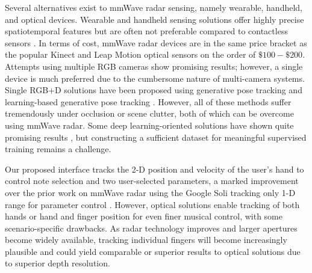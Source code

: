 \documentclass[10pt,journal,final]{IEEEtran}
\begin{document}
Several alternatives exist to mmWave radar sensing, namely wearable, handheld, and optical devices. 
Wearable and handheld sensing solutions offer highly precise spatiotemporal features but are often not preferable compared to contactless sensors \cite{pardue2013hand,neto2010high}.
In terms of cost, mmWave radar devices are in the same price bracket as the popular Kinect and Leap Motion optical sensors on the order of $\$100-\$200$.
Attempts using multiple RGB cameras \cite{ballan2012motion,sridhar2013interactive} show promising results; however, a single device is much preferred due to the cumbersome nature of multi-camera systems. 
Single RGB+D solutions have been proposed using generative pose tracking \cite{oikonomidis2011efficient,tang2015opening} and learning-based generative pose tracking \cite{sridhar2015fast,taylor2016efficient}.
However, all of these methods suffer tremendously under occlusion or scene clutter, both of which can be overcome using mmWave radar. 
Some deep learning-oriented solutions have shown quite promising results \cite{tompson2014real,ye2016spatial}, but constructing a sufficient dataset for meaningful supervised training remains a challenge. 

Our proposed interface tracks the 2-D position and velocity of the user's hand to control note selection and two user-selected parameters, a marked improvement over the prior work on mmWave radar using the Google Soli tracking only 1-D range for parameter control \cite{intro:soli_musical_instrument}. 
However, optical solutions enable tracking of both hands \cite{polfreman2011multi,jensenius2013kinectofon,hantrakul2014implementations,tompson2014real,ye2016spatial,sridhar2015fast,taylor2016efficient,oikonomidis2011efficient,tang2015opening} or hand and finger position \cite{han2014lessons,intro:RGBcamera} for even finer musical control, with some scenario-specific drawbacks. 
As radar technology improves and larger apertures become widely available, tracking individual fingers will become increasingly plausible and could yield comparable or superior results to optical solutions due to superior depth resolution.
\end{document}
